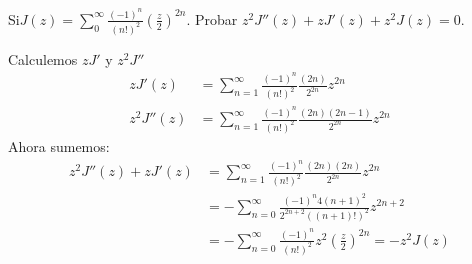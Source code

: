 \begin{homeworkProblem}
  Si$J(z) = \sum_0^\infty \frac{(-1)^n}{(n!)^2} \left(\frac{z}{2}\right)^{2n}$. Probar $z^2 J''(z) + zJ'(z) + z^2 J(z) = 0$.
  \begin{solution}
    Calculemos $zJ'$ y $z^2J''$ 
    \begin{align*}
      zJ'(z) &= \sum_{n=1}^{\infty} \frac{(-1)^n}{(n!)^2} \frac{(2n)}{2^{2n}} z^{2n}\\
      z^{2}J''(z) &= \sum_{n=1}^{\infty} \frac{(-1)^n}{(n!)^2} \frac{(2n)(2n-1)}{2^{2n}} z^{2n}
    \end{align*}
    Ahora sumemos:
    \begin{align*}
      z^2J''(z)+zJ'(z)&=\sum_{n=1}^{\infty} \frac{(-1)^n}{(n!)^2} \frac{(2n)(2n)}{2^{2n}} z^{2n}\\
      &=-\sum_{n=0}^{\infty} \frac{(-1)^n4(n+1)^2}{2^{2n+2}((n+1)!)^2} z^{2n+2}\\
      &=-\sum_{n=0}^{\infty} \frac{(-1)^n}{(n!)^2}z^2\left( \frac{z}{2} \right)^{2n} = -z^2J(z)
    \end{align*}
  \end{solution}
\end{homeworkProblem}
